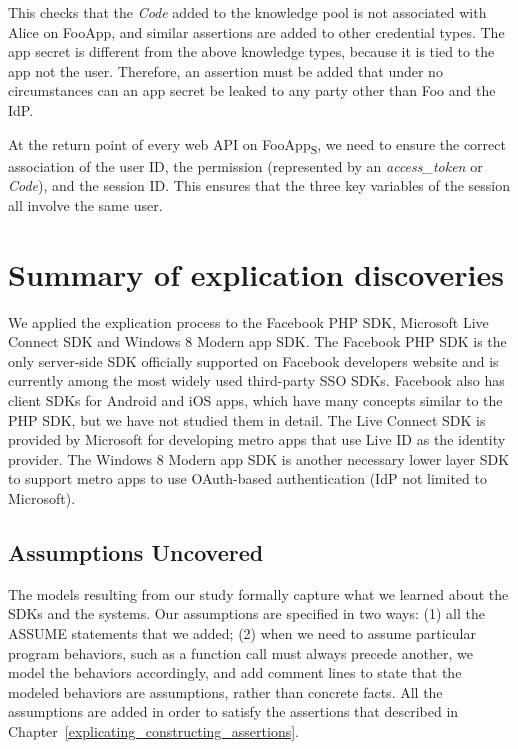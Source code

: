 
This checks that the \emph{Code} added to the knowledge pool is not associated with Alice on FooApp, and similar assertions are added to other credential types.  The app secret is different from the above knowledge types, because it is tied to the app not the user.  Therefore, an assertion must be added that under no circumstances can an app secret be leaked to any party other than Foo and the IdP.

 At the return point of every web API on FooApp\textsubscript{S}, we need to ensure the correct association of the user ID, the permission (represented by an \emph{access\_token} or \emph{Code}), and the session ID.  This ensures that the three key variables of the session all involve the same user.

\section{Summary of explication discoveries}
\label{sec:explicating_discoveries}

We applied the explication process to the Facebook PHP SDK, Microsoft Live Connect SDK and Windows 8 Modern app SDK.  The Facebook PHP SDK is the only server-side SDK officially supported on Facebook developers website and is currently among the most widely used third-party SSO SDKs.  Facebook also has client SDKs for Android and iOS apps, which have many concepts similar to the PHP SDK, but we have not studied them in detail.  The Live Connect SDK is provided by Microsoft for developing metro apps that use Live ID as the identity provider.  The Windows 8 Modern app SDK is another necessary lower layer SDK to support metro apps to use OAuth-based authentication (IdP not limited to Microsoft).  

\subsection{Assumptions Uncovered}

The models resulting from our study formally capture what we learned about the SDKs and the systems. Our assumptions are specified in two ways: (1) all the ASSUME statements that we added; (2) when we need to assume particular program behaviors, such as a function call must always precede another, we model the behaviors accordingly, and add comment lines to state that the modeled behaviors are assumptions, rather than concrete facts.  All the assumptions are added in order to satisfy the assertions that described in Chapter~\ref{explicating_constructing_assertions}.

